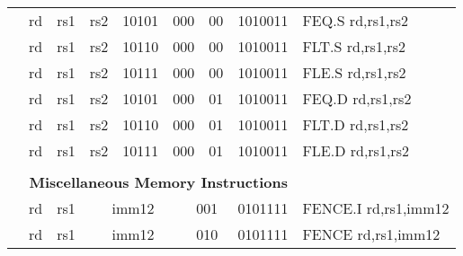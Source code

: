 \begin{table}[p]
\begin{small}
\begin{center}
\begin{tabular}{rccccccccccl}
&
\multicolumn{1}{|c|}{rd} &
\multicolumn{1}{c|}{rs1} &
\multicolumn{1}{c|}{rs2} &
\multicolumn{3}{c|}{10101} &
\multicolumn{2}{c|}{000} &
\multicolumn{1}{c|}{00} &
\multicolumn{1}{c|}{1010011} & FEQ.S rd,rs1,rs2 \\
\cline{2-11}
  

&
\multicolumn{1}{|c|}{rd} &
\multicolumn{1}{c|}{rs1} &
\multicolumn{1}{c|}{rs2} &
\multicolumn{3}{c|}{10110} &
\multicolumn{2}{c|}{000} &
\multicolumn{1}{c|}{00} &
\multicolumn{1}{c|}{1010011} & FLT.S rd,rs1,rs2 \\
\cline{2-11}
  

&
\multicolumn{1}{|c|}{rd} &
\multicolumn{1}{c|}{rs1} &
\multicolumn{1}{c|}{rs2} &
\multicolumn{3}{c|}{10111} &
\multicolumn{2}{c|}{000} &
\multicolumn{1}{c|}{00} &
\multicolumn{1}{c|}{1010011} & FLE.S rd,rs1,rs2 \\
\cline{2-11}
  

&
\multicolumn{1}{|c|}{rd} &
\multicolumn{1}{c|}{rs1} &
\multicolumn{1}{c|}{rs2} &
\multicolumn{3}{c|}{10101} &
\multicolumn{2}{c|}{000} &
\multicolumn{1}{c|}{01} &
\multicolumn{1}{c|}{1010011} & FEQ.D rd,rs1,rs2 \\
\cline{2-11}
  

&
\multicolumn{1}{|c|}{rd} &
\multicolumn{1}{c|}{rs1} &
\multicolumn{1}{c|}{rs2} &
\multicolumn{3}{c|}{10110} &
\multicolumn{2}{c|}{000} &
\multicolumn{1}{c|}{01} &
\multicolumn{1}{c|}{1010011} & FLT.D rd,rs1,rs2 \\
\cline{2-11}
  

&
\multicolumn{1}{|c|}{rd} &
\multicolumn{1}{c|}{rs1} &
\multicolumn{1}{c|}{rs2} &
\multicolumn{3}{c|}{10111} &
\multicolumn{2}{c|}{000} &
\multicolumn{1}{c|}{01} &
\multicolumn{1}{c|}{1010011} & FLE.D rd,rs1,rs2 \\
\cline{2-11}
  

&
\multicolumn{10}{c}{} & \\
&
\multicolumn{10}{c}{\bf Miscellaneous Memory Instructions} & \\
\cline{2-11}
  

&
\multicolumn{1}{|c|}{rd} &
\multicolumn{1}{c|}{rs1} &
\multicolumn{5}{c|}{imm12} &
\multicolumn{2}{c|}{001} &
\multicolumn{1}{c|}{0101111} & FENCE.I rd,rs1,imm12 \\
\cline{2-11}
  

&
\multicolumn{1}{|c|}{rd} &
\multicolumn{1}{c|}{rs1} &
\multicolumn{5}{c|}{imm12} &
\multicolumn{2}{c|}{010} &
\multicolumn{1}{c|}{0101111} & FENCE rd,rs1,imm12 \\
\cline{2-11}
  


\end{tabular}
\end{center}
\end{small}
\end{table}
